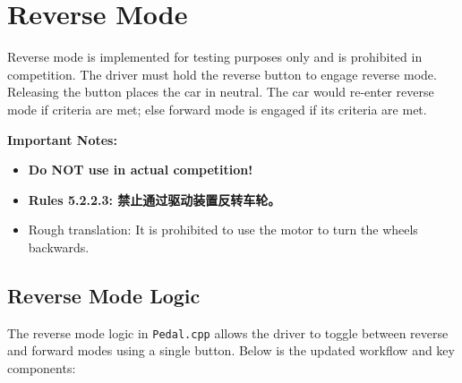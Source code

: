 \documentclass[a4paper,12pt]{article}
\begin{document}
\section{Reverse Mode}
Reverse mode is implemented for testing purposes only and is prohibited in competition. The driver must hold the reverse button to engage reverse mode. Releasing the button places the car in neutral. The car would re-enter reverse mode if criteria are met; else forward mode is engaged if its criteria are met.

\textbf{Important Notes:}
{
\begin{itemize}
    \item \textbf{Do NOT use in actual competition!}
    \item \textbf{Rules 5.2.2.3: 禁止通过驱动装置反转车轮。}
    \item Rough translation: It is prohibited to use the motor to turn the wheels backwards.
\end{itemize}
}

\subsection{Reverse Mode Logic}
The reverse mode logic in \texttt{Pedal.cpp} allows the driver to toggle between reverse and forward modes using a single button. Below is the updated workflow and key components:
\end{document}
